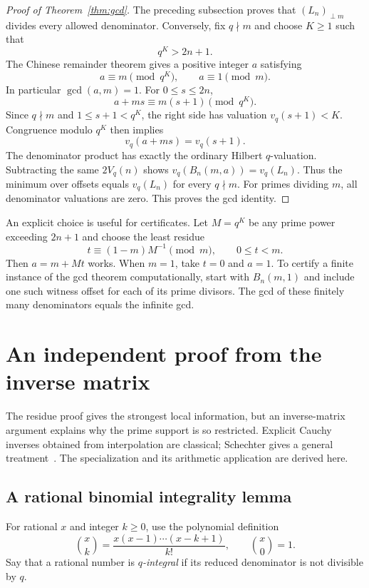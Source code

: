 \documentclass[11pt,a4paper]{article}
\numberwithin{equation}{section}
\theoremstyle{definition}
\theoremstyle{remark}
\begin{document}
\begin{proof}[Proof of Theorem~\ref{thm:gcd}]
The preceding subsection proves that $(L_n)_{\perp m}$ divides every allowed denominator. Conversely, fix $q\nmid m$ and choose $K\geq1$ such that
\[
 q^K>2n+1.
\]
The Chinese remainder theorem gives a positive integer $a$ satisfying
\begin{equation}\label{eq:crt}
 a\equiv m\pmod{q^K},\qquad a\equiv1\pmod m.
\end{equation}
In particular $\gcd(a,m)=1$. For $0\leq s\leq2n$,
\[
 a+ms\equiv m(s+1)\pmod{q^K}.
\]
Since $q\nmid m$ and $1\leq s+1<q^K$, the right side has valuation $v_q(s+1)<K$. Congruence modulo $q^K$ then implies
\[
 v_q(a+ms)=v_q(s+1).
\]
The denominator product has exactly the ordinary Hilbert $q$-valuation. Subtracting the same $2V_q(n)$ shows
$v_q(B_n(m,a))=v_q(L_n)$. Thus the minimum over offsets equals $v_q(L_n)$ for every $q\nmid m$. For primes dividing $m$, all denominator valuations are zero. This proves the gcd identity.
\end{proof}

An explicit choice is useful for certificates. Let $M=q^K$ be any prime power exceeding $2n+1$ and choose the least residue
\[
 t\equiv (1-m)M^{-1}\pmod m,\qquad 0\leq t<m.
\]
Then $a=m+Mt$ works. When $m=1$, take $t=0$ and $a=1$. To certify a finite instance of the gcd theorem computationally, start with $B_n(m,1)$ and include one such witness offset for each of its prime divisors. The gcd of these finitely many denominators equals the infinite gcd.

\section{An independent proof from the inverse matrix}\label{sec:inverse}

The residue proof gives the strongest local information, but an inverse-matrix argument explains why the prime support is so restricted. Explicit Cauchy inverses obtained from interpolation are classical; Schechter gives a general treatment~\cite{schechter}. The specialization and its arithmetic application are derived here.

\subsection{A rational binomial integrality lemma}
For rational $x$ and integer $k\geq0$, use the polynomial definition
\[
 \binom{x}{k}=\frac{x(x-1)\cdots(x-k+1)}{k!},\qquad \binom{x}{0}=1.
\]
Say that a rational number is \emph{$q$-integral} if its reduced denominator is not divisible by $q$.
\end{document}
